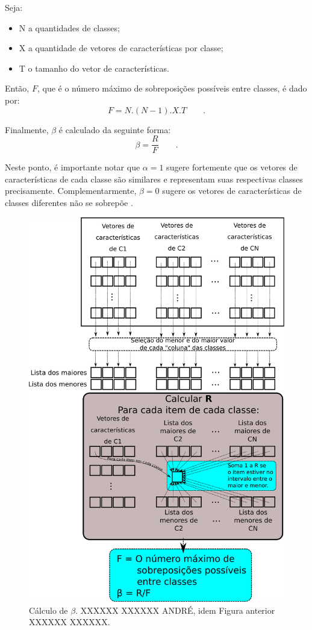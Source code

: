				\par Seja:
				\begin{itemize}
					\item N a quantidades de classes;
					\item X a quantidade de vetores de características por classe;
					\item T o tamanho do vetor de características.
				\end{itemize}
				
				\par Então, $F$, que é o número máximo de sobreposições possíveis entre classes, é dado por:
				\begin{equation}
						F=N.(N-1).X.T \qquad.
				\end{equation}
				\par Finalmente, $\beta$ é calculado da seguinte forma:
				\begin{equation}
					\beta=\dfrac{R}{F} \qquad.
				\end{equation}
			
				\par Neste ponto, é importante notar que $\alpha=1$ sugere fortemente que os vetores de características de cada classe são similares e representam suas respectivas classes precisamente. Complementarmente, $\beta=0$ sugere os vetores de características de classes diferentes não se sobrepõe \cite{8588433}.
				
				\begin{figure}[h]
					\centering
		    	\includegraphics[width=0.55\linewidth]{images/betaCalculation.pdf}
					\caption{Cálculo de $\beta$. XXXXXX XXXXXX ANDRÉ, idem Figura anterior XXXXXX XXXXXX.}
					\label{fig:betacalculation}
				\end{figure}
			
